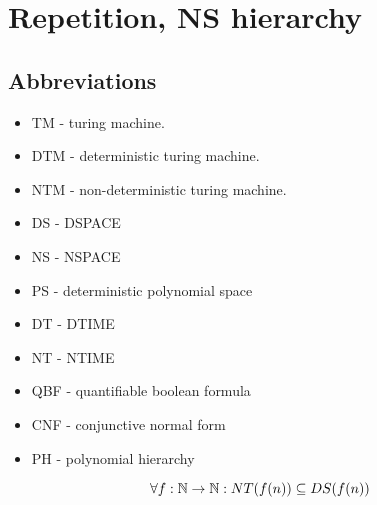 \section{\texorpdfstring{Repetition, NS hierarchy}{Repetition, NS hierarchy}}
\vspace{5mm}
\large

\subsection{Abbreviations}
\begin{itemize}
	\item TM - turing machine.
	\item DTM - deterministic turing machine.
	\item NTM - non-deterministic turing machine.
	\item DS - DSPACE
	\item NS - NSPACE
	\item PS - deterministic polynomial space
	\item DT - DTIME
	\item NT - NTIME
	\item QBF - quantifiable boolean formula
	\item CNF - conjunctive normal form
	\item PH - polynomial hierarchy
\end{itemize}

\begin{theorem}\label{nt_ds_rel}
	\[ \forall f:\operatorname{\mathbb{N}} \to \operatorname{\mathbb{N}}: NT(f(n)) \subseteq DS(f(n)) \]
\end{theorem}

